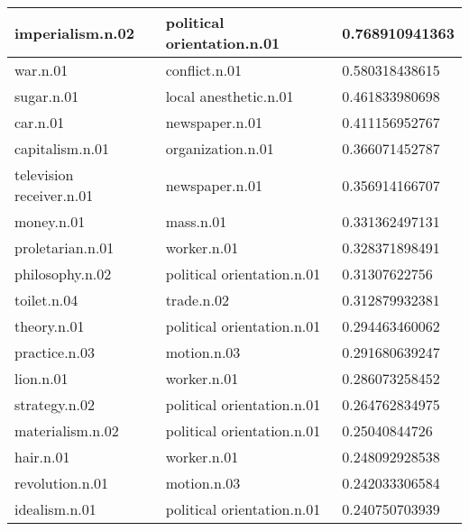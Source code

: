 \begin{center}
\begin{tabular}{ | l | l | l |}
imperialism.n.02 & political orientation.n.01 & 0.768910941363\\ \hline
war.n.01 & conflict.n.01 & 0.580318438615\\ \hline
sugar.n.01 & local anesthetic.n.01 & 0.461833980698\\ \hline
car.n.01 & newspaper.n.01 & 0.411156952767\\ \hline
capitalism.n.01 & organization.n.01 & 0.366071452787\\ \hline
television receiver.n.01 & newspaper.n.01 & 0.356914166707\\ \hline
money.n.01 & mass.n.01 & 0.331362497131\\ \hline
proletarian.n.01 & worker.n.01 & 0.328371898491\\ \hline
philosophy.n.02 & political orientation.n.01 & 0.31307622756\\ \hline
toilet.n.04 & trade.n.02 & 0.312879932381\\ \hline
theory.n.01 & political orientation.n.01 & 0.294463460062\\ \hline
practice.n.03 & motion.n.03 & 0.291680639247\\ \hline
lion.n.01 & worker.n.01 & 0.286073258452\\ \hline
strategy.n.02 & political orientation.n.01 & 0.264762834975\\ \hline
materialism.n.02 & political orientation.n.01 & 0.25040844726\\ \hline
hair.n.01 & worker.n.01 & 0.248092928538\\ \hline
revolution.n.01 & motion.n.03 & 0.242033306584\\ \hline
idealism.n.01 & political orientation.n.01 & 0.240750703939\\ \hline
\end{tabular}
\end{center}